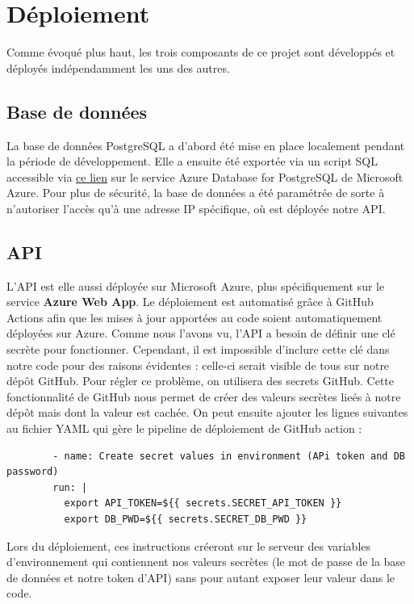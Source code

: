 \documentclass[french]{article}
\begin{document}
    \section{Déploiement}
    Comme évoqué plus haut, les trois composants de ce projet sont développés et déployés indépendamment les uns des autres.
    \subsection{Base de données}
    La base de données PostgreSQL a d'abord été mise en place localement pendant la période de développement. Elle a ensuite été exportée via un script SQL accessible via \href{https://github.com/vinpap/your_news_anchor_db_api/blob/main/create_db.sql}{ce lien} sur le service Azure Database for PostgreSQL de Microsoft Azure. 
    Pour plus de sécurité, la base de données a été paramétrée de sorte à n'autoriser l'accès qu'à une adresse IP spécifique, où est déployée notre API.

    \subsection{API}

    L'API est elle aussi déployée sur Microsoft Azure, plus spécifiquement sur le service \textbf{Azure Web App}. Le déploiement est automatisé grâce à GitHub Actions afin que les mises à jour apportées au code soient automatiquement déployées sur Azure.
    Comme nous l'avons vu, l'API a besoin de définir une clé secrète pour fonctionner. Cependant, il est impossible d'inclure cette clé dans notre code pour des raisons évidentes : celle-ci serait visible de tous sur notre dépôt GitHub. Pour régler ce problème, on utilisera des secrets GitHub. Cette fonctionnalité de GitHub nous permet de créer des valeurs secrètes lieés à notre dépôt mais dont la valeur est cachée. On peut ensuite ajouter les lignes suivantes au fichier YAML qui gère le pipeline de déploiement de GitHub action : 
    \begin{verbatim}
        - name: Create secret values in environment (APi token and DB password)
        run: |
          export API_TOKEN=${{ secrets.SECRET_API_TOKEN }}
          export DB_PWD=${{ secrets.SECRET_DB_PWD }}
    \end{verbatim}

    Lors du déploiement, ces instructions créeront sur le serveur des variables d'environnement qui contiennent nos valeurs secrètes (le mot de passe de la base de données et notre token d'API) sans pour autant exposer leur valeur dans le code.
\end{document}
